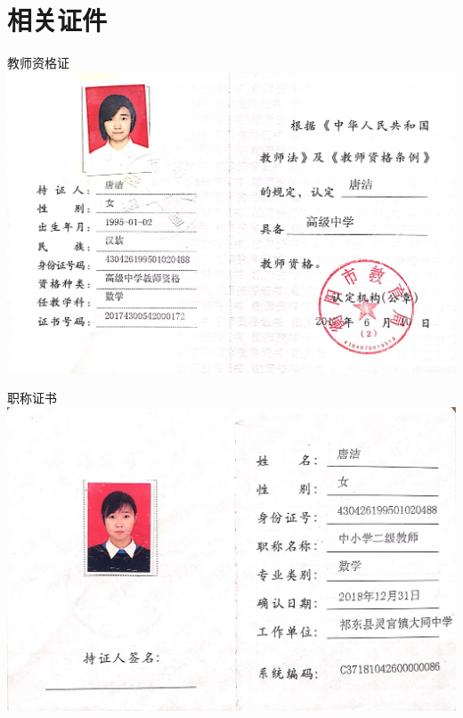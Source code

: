 \documentclass[UFT8]{ctexart}%
\begin{document}
\section{相关证件}
\begin{center}
教师资格证
  \includegraphics[scale=0.20]{figs/教师资格证.JPG }

职称证书
  \includegraphics[scale=0.25]{figs/中二职称证书.JPG }
  

\end{center}
\end{document}
